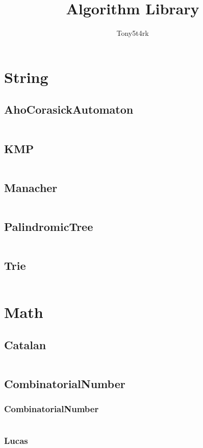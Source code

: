 \documentclass[a4paper,11pt]{article}
\author{Tony5t4rk}
\title{Algorithm Library}
\begin{document}
 
\maketitle
\newpage
\tableofcontents
\newpage

\section{String}
\subsection{AhoCorasickAutomaton}
\inputminted[breaklines]{c++}{String/+AhoCorasickAutomaton.cpp}
\subsection{KMP}
\inputminted[breaklines]{c++}{String/+KMP.cpp}
\subsection{Manacher}
\inputminted[breaklines]{c++}{String/+Manacher.cpp}
\subsection{PalindromicTree}
\inputminted[breaklines]{c++}{String/+PalindromicTree.cpp}
\subsection{Trie}
\inputminted[breaklines]{c++}{String/+Trie.cpp}

\newpage
\section{Math}
\subsection{Catalan}
\inputminted[breaklines]{c++}{Math/+Catalan.cpp}
\subsection{CombinatorialNumber}
\subsubsection{CombinatorialNumber}
\inputminted[breaklines]{c++}{Math/+CombinatorialNumber/+CombinatorialNumber.cpp}
\subsubsection{Lucas}
\inputminted[breaklines]{c++}{Math/+CombinatorialNumber/+Lucas.cpp}
\end{document}
